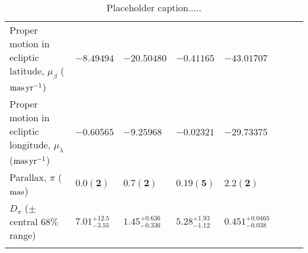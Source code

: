 \begin{table}
\begin{tabular}{llllllll}
Proper motion in ecliptic latitude, $\mu_\beta$ (${\rm mas}\,{\rm yr}^{-1}$)	 & 	 $\mathbf{ -8.49494 }$	 & 	 $\mathbf{ -20.50480 }$	 & 	 $\mathbf{ -0.41165 }$	 & 	 $\mathbf{ -43.01707 }$\\ 
Proper motion in ecliptic longitude, $\mu_\lambda$ (${\rm mas}\,{\rm yr}^{-1}$)	 & 	 $\mathbf{ -0.60565 }$	 & 	 $\mathbf{ -9.25968 }$	 & 	 $\mathbf{ -0.02321 }$	 & 	 $\mathbf{ -29.73375 }$\\ 
Parallax, $\pi$ (${\rm mas}$)	 & 	 $\mathbf{ 0.0(2) }$	 & 	 $\mathbf{ 0.7(2) }$	 & 	 $\mathbf{ 0.19(5) }$	 & 	 $\mathbf{ 2.2(2) }$\\ 
$D_\pi$ ($\pm$ central $68\%$ range)	 & 	 $7.01^{ +12.5 }_{ -3.55 }$	 & 	 $1.45^{ +0.636 }_{ -0.336 }$	 & 	 $5.28^{ +1.93 }_{ -1.12 }$	 & 	 $0.451^{ +0.0465 }_{ -0.038 }$\\ 

        \\ \hline\hline
        \end{tabular}\hfill\
        \caption{\label{tab:XXXXX}
        Placeholder caption.....
        }
        \end{table}
        